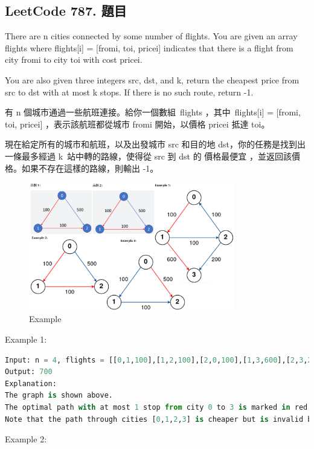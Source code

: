 \documentclass[10pt,UTF8]{ctexart}
\begin{document}
\subsection{LeetCode 787. 題目}

There are n cities connected by some number of flights. You are given an array flights where flights[i] = [fromi, toi, pricei] indicates that there is a flight from city fromi to city toi with cost pricei.

You are also given three integers src, dst, and k, return the cheapest price from src to dst with at most k stops. If there is no such route, return -1.

有 n 個城市通過一些航班連接。給你一個數組 flights ，其中 flights[i] = [fromi, toi, pricei] ，表示該航班都從城市 fromi 開始，以價格 pricei 抵達 toi。

現在給定所有的城市和航班，以及出發城市 src 和目的地 dst，你的任務是找到出一條最多經過 k 站中轉的路線，使得從 src 到 dst 的 價格最便宜 ，並返回該價格。如果不存在這樣的路線，則輸出 -1。

\begin{figure}[H]
\centering 
\includegraphics[width=0.80\textwidth]{lc-787-p-example.png} 
\caption{Example}
\label{Test}
\end{figure}

Example 1:

\begin{lstlisting}[language={python}]
Input: n = 4, flights = [[0,1,100],[1,2,100],[2,0,100],[1,3,600],[2,3,200]], src = 0, dst = 3, k = 1
Output: 700
Explanation:
The graph is shown above.
The optimal path with at most 1 stop from city 0 to 3 is marked in red and has cost 100 + 600 = 700.
Note that the path through cities [0,1,2,3] is cheaper but is invalid because it uses 2 stops.
\end{lstlisting}

Example 2:
\end{document}
